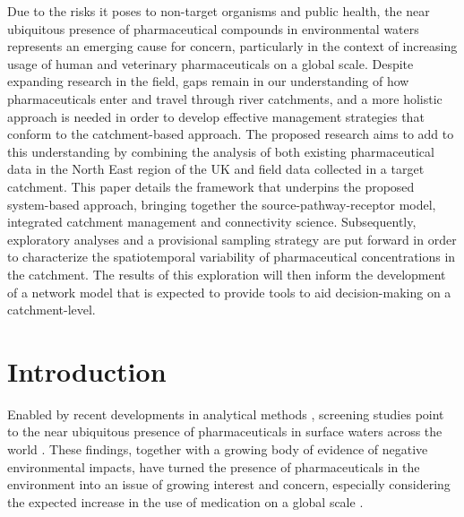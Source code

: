 \documentclass{article}
\renewenvironment{abstract}
 {\normalsize
  \begin{center}
  \bfseries \large \abstractname \vspace{-.5em}\vspace{0pt}
  \end{center}
  \list{}{
    \setlength{\leftmargin}{.5cm}%
    \setlength{\rightmargin}{\leftmargin}%
  }%
  \item\relax}
 {\endlist}
\begin{document}
\begin{abstract} 
Due to the risks it poses to non-target organisms and public health, the near ubiquitous presence of pharmaceutical compounds in environmental waters represents an emerging cause for concern, particularly in the context of increasing usage of human and veterinary pharmaceuticals on a global scale. Despite expanding research in the field, gaps remain in our understanding of how pharmaceuticals enter and travel through river catchments, and a more holistic approach is needed in order to develop effective management strategies that conform to the catchment-based approach. The proposed research aims to add to this understanding by combining the analysis of both existing pharmaceutical data in the North East region of the UK and field data collected in a target catchment. This paper details the framework that underpins the proposed system-based approach, bringing together the source-pathway-receptor model, integrated catchment management and connectivity science. Subsequently, exploratory analyses and a provisional sampling strategy are put forward in order to characterize the spatiotemporal variability of pharmaceutical concentrations in the catchment. The results of this exploration will then inform the development of a network model that is expected to provide tools to aid decision-making on a catchment-level.
\end{abstract}

\clearpage
\tableofcontents



\clearpage
{}
\section{Introduction}
Enabled by recent developments in analytical methods \citep{Knoll2020TrendsSamples}, screening studies point to the near ubiquitous presence of pharmaceuticals in surface waters across the world \citep{Bai2018OccurrenceWatersheds,Hughes2013GlobalSystems,Kolpin2002PharmaceuticalsReconnaissance}. These findings, together with a growing body of evidence of negative environmental impacts, have turned the presence of pharmaceuticals in the environment into an issue of growing interest and concern, especially considering the expected increase in the use of medication on a global scale \citep{Hughes2013GlobalSystems,UNEP2017PharmaceuticalsIssue}. 
\end{document}

